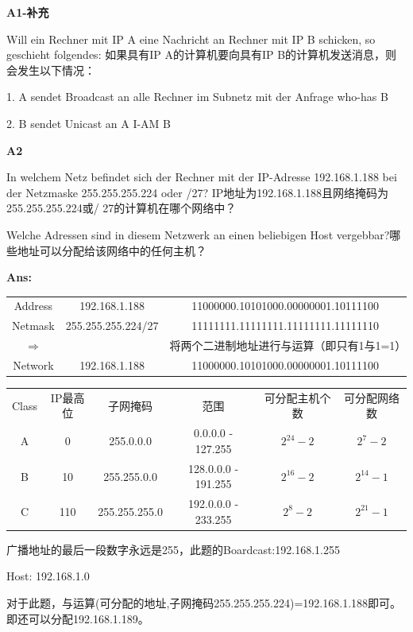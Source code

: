 \documentclass[fleqn]{article}
\begin{document}
\noindent\textbf{A1-补充}

Will ein Rechner mit IP A eine Nachricht an Rechner mit IP B schicken, so geschieht folgendes:
如果具有IP A的计算机要向具有IP B的计算机发送消息，则会发生以下情况：

1. A sendet Broadcast an alle Rechner im Subnetz mit der Anfrage who-has B

2. B sendet Unicast an A I-AM B

\noindent\textbf{A2}

In welchem Netz befindet sich der Rechner mit der IP-Adresse 192.168.1.188 bei der Netzmaske 255.255.255.224 oder /27? 
IP地址为192.168.1.188且网络掩码为255.255.255.224或/ 27的计算机在哪个网络中？

Welche Adressen sind in diesem Netzwerk an einen beliebigen Host vergebbar?哪些地址可以分配给该网络中的任何主机？

\textbf{Ans:}

\begin{center}
    \begin{tabular}{c|c|c}
        Address&192.168.1.188&11000000.10101000.00000001.10111100\\
        Netmask&255.255.255.224/27&11111111.11111111.11111111.11111110\\
        $\Rightarrow$&&将两个二进制地址进行与运算（即只有1与1=1）\\
        Network&192.168.1.188&11000000.10101000.00000001.10111100
    \end{tabular}
\end{center}

\begin{center}
    \begin{tabular}{c|c|c|c|c|c}
        Class&IP最高位&子网掩码&范围&可分配主机个数&可分配网络数\\
        A&0&255.0.0.0&0.0.0.0 - 127.255&$2^{24}-2$&$2^7-2$\\
        B&10&255.255.0.0&128.0.0.0 - 191.255&$2^{16}-2$&$2^{14}-1$\\
        C&110&255.255.255.0&192.0.0.0 - 233.255&$2^{8}-2$&$2^{21}-1$
    \end{tabular}
\end{center}

\indent 广播地址的最后一段数字永远是255，此题的Boardcast:192.168.1.255

\indent Host: 192.168.1.0

\indent 对于此题，与运算(可分配的地址,子网掩码255.255.255.224)=192.168.1.188即可。即还可以分配192.168.1.189。
\end{document}

